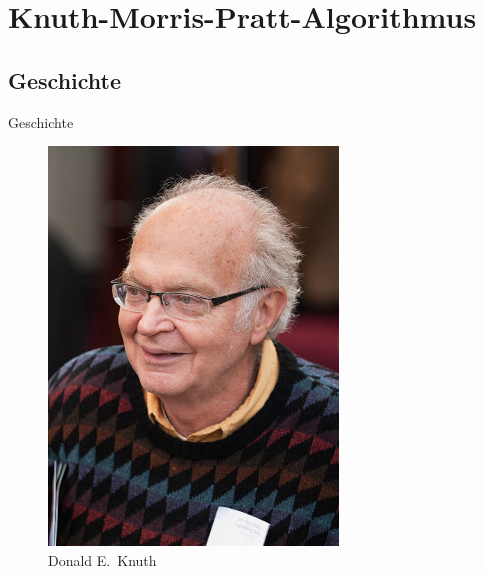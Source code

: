 \documentclass[xcolor=dvipsnames, aspectratio=169]{beamer}
\begin{document}
\section{Knuth-Morris-Pratt-Algorithmus}

\subsection{Geschichte}

\begin{frame}{Geschichte}
\begin{minipage}{0.3\textwidth}
\begin{figure}
\includegraphics[width=.8\textwidth]{knuth}
\caption{Donald E.\ Knuth}
\end{figure}
\end{minipage}
\hfill
\begin{minipage}{0.3\textwidth}
\begin{figure}

\end{figure}
\end{minipage}
\end{frame}
\end{document}
